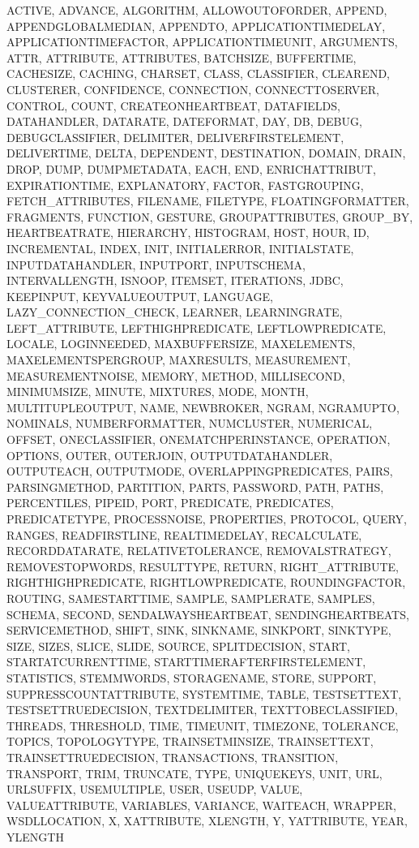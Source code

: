 {{ACTIVE, ADVANCE, ALGORITHM, ALLOWOUTOFORDER, APPEND, APPENDGLOBALMEDIAN, APPENDTO, APPLICATIONTIMEDELAY, APPLICATIONTIMEFACTOR, APPLICATIONTIMEUNIT, ARGUMENTS, ATTR, ATTRIBUTE, ATTRIBUTES, BATCHSIZE, BUFFERTIME, CACHESIZE, CACHING, CHARSET, CLASS, CLASSIFIER, CLEAREND, CLUSTERER, CONFIDENCE, CONNECTION, CONNECTTOSERVER, CONTROL, COUNT, CREATEONHEARTBEAT, DATAFIELDS, DATAHANDLER, DATARATE, DATEFORMAT, DAY, DB, DEBUG, DEBUGCLASSIFIER, DELIMITER, DELIVERFIRSTELEMENT, DELIVERTIME, DELTA, DEPENDENT, DESTINATION, DOMAIN, DRAIN, DROP, DUMP, DUMPMETADATA, EACH, END, ENRICHATTRIBUT, EXPIRATIONTIME, EXPLANATORY, FACTOR, FASTGROUPING, FETCH_ATTRIBUTES, FILENAME, FILETYPE, FLOATINGFORMATTER, FRAGMENTS, FUNCTION, GESTURE, GROUPATTRIBUTES, GROUP_BY, HEARTBEATRATE, HIERARCHY, HISTOGRAM, HOST, HOUR, ID, INCREMENTAL, INDEX, INIT, INITIALERROR, INITIALSTATE, INPUTDATAHANDLER, INPUTPORT, INPUTSCHEMA, INTERVALLENGTH, ISNOOP, ITEMSET, ITERATIONS, JDBC, KEEPINPUT, KEYVALUEOUTPUT, LANGUAGE, LAZY_CONNECTION_CHECK, LEARNER, LEARNINGRATE, LEFT_ATTRIBUTE, LEFTHIGHPREDICATE, LEFTLOWPREDICATE, LOCALE, LOGINNEEDED, MAXBUFFERSIZE, MAXELEMENTS, MAXELEMENTSPERGROUP, MAXRESULTS, MEASUREMENT, MEASUREMENTNOISE, MEMORY, METHOD, MILLISECOND, MINIMUMSIZE, MINUTE, MIXTURES, MODE, MONTH, MULTITUPLEOUTPUT, NAME, NEWBROKER, NGRAM, NGRAMUPTO, NOMINALS, NUMBERFORMATTER, NUMCLUSTER, NUMERICAL, OFFSET, ONECLASSIFIER, ONEMATCHPERINSTANCE, OPERATION, OPTIONS, OUTER, OUTERJOIN, OUTPUTDATAHANDLER, OUTPUTEACH, OUTPUTMODE, OVERLAPPINGPREDICATES, PAIRS, PARSINGMETHOD, PARTITION, PARTS, PASSWORD, PATH, PATHS, PERCENTILES, PIPEID, PORT, PREDICATE, PREDICATES, PREDICATETYPE, PROCESSNOISE, PROPERTIES, PROTOCOL, QUERY, RANGES, READFIRSTLINE, REALTIMEDELAY, RECALCULATE, RECORDDATARATE, RELATIVETOLERANCE, REMOVALSTRATEGY, REMOVESTOPWORDS, RESULTTYPE, RETURN, RIGHT_ATTRIBUTE, RIGHTHIGHPREDICATE, RIGHTLOWPREDICATE, ROUNDINGFACTOR, ROUTING, SAMESTARTTIME, SAMPLE, SAMPLERATE, SAMPLES, SCHEMA, SECOND, SENDALWAYSHEARTBEAT, SENDINGHEARTBEATS, SERVICEMETHOD, SHIFT, SINK, SINKNAME, SINKPORT, SINKTYPE, SIZE, SIZES, SLICE, SLIDE, SOURCE, SPLITDECISION, START, STARTATCURRENTTIME, STARTTIMERAFTERFIRSTELEMENT, STATISTICS, STEMMWORDS, STORAGENAME, STORE, SUPPORT, SUPPRESSCOUNTATTRIBUTE, SYSTEMTIME, TABLE, TESTSETTEXT, TESTSETTRUEDECISION, TEXTDELIMITER, TEXTTOBECLASSIFIED, THREADS, THRESHOLD, TIME, TIMEUNIT, TIMEZONE, TOLERANCE, TOPICS, TOPOLOGYTYPE, TRAINSETMINSIZE, TRAINSETTEXT, TRAINSETTRUEDECISION, TRANSACTIONS, TRANSITION, TRANSPORT, TRIM, TRUNCATE, TYPE, UNIQUEKEYS, UNIT, URL, URLSUFFIX, USEMULTIPLE, USER, USEUDP, VALUE, VALUEATTRIBUTE, VARIABLES, VARIANCE, WAITEACH, WRAPPER, WSDLLOCATION, X, XATTRIBUTE, XLENGTH, Y, YATTRIBUTE, YEAR, YLENGTH%
}}
